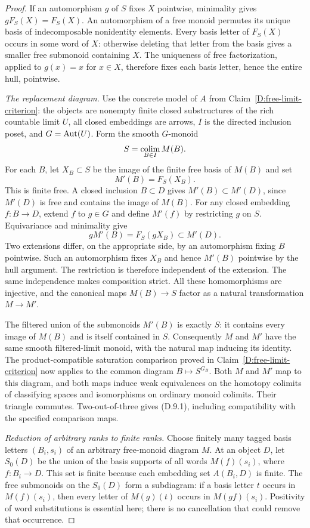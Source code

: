 \begin{proof}
If an automorphism $g$ of $S$ fixes $X$ pointwise, minimality gives
$gF_S(X)=F_S(X)$. An automorphism of a free monoid permutes its
unique basis of indecomposable nonidentity elements. Every basis
letter of $F_S(X)$ occurs in some word of $X$: otherwise deleting
that letter from the basis gives a smaller free submonoid containing
$X$. The uniqueness of free factorization, applied to $g(x)=x$
for $x\in X$, therefore fixes each basis letter, hence the entire
hull, pointwise.

\emph{The replacement diagram.}
Use the concrete model of $A$ from
Claim~\ref{D:free-limit-criterion}: the objects are nonempty finite
closed substructures of the rich countable limit $U$, all closed
embeddings are arrows, $I$ is the directed inclusion poset, and
$G=\operatorname{Aut}(U)$. Form the smooth $G$-monoid
\[
 S=\operatorname*{colim}_{B\in I}M(B).
\]
For each $B$, let $X_B\subset S$ be the image of the finite free
basis of $M(B)$ and set
\[
 M'(B)=F_S(X_B).
\]
This is finite free. A closed inclusion $B\subset D$ gives
$M'(B)\subset M'(D)$, since $M'(D)$ is free and contains the image
of $M(B)$. For any closed embedding $f:B\to D$, extend $f$ to
$g\in G$ and define $M'(f)$ by restricting $g$ on $S$. Equivariance
and minimality give
\[
 gM'(B)=F_S(gX_B)\subset M'(D).
\]
Two extensions differ, on the appropriate side, by an automorphism
fixing $B$ pointwise. Such an automorphism fixes $X_B$ and hence
$M'(B)$ pointwise by the hull argument. The restriction is therefore
independent of the extension. The same independence makes
composition strict. All these homomorphisms are injective, and the
canonical maps $M(B)\to S$ factor as a natural transformation
$M\to M'$.

The filtered union of the submonoids $M'(B)$ is exactly $S$:
it contains every image of $M(B)$ and is itself contained in $S$.
Consequently $M$ and $M'$ have the same smooth filtered-limit
monoid, with the natural map inducing its identity. The
product-compatible saturation comparison proved in
Claim~\ref{D:free-limit-criterion} now applies to the common diagram
$B\mapsto S^{G_B}$. Both $M$ and $M'$ map to this diagram, and
both maps induce weak equivalences on the homotopy colimits of
classifying spaces and isomorphisms on ordinary monoid colimits.
Their triangle commutes. Two-out-of-three gives (D.9.1), including
compatibility with the specified comparison maps.

\emph{Reduction of arbitrary ranks to finite ranks.}
Choose finitely many tagged basis letters $(B_i,s_i)$ of an
arbitrary free-monoid diagram $M$. At an object $D$, let $S_0(D)$
be the union of the basis supports of all words $M(f)(s_i)$,
where $f:B_i\to D$. This set is finite because each embedding set
$A(B_i,D)$ is finite. The free submonoids on the $S_0(D)$ form a
subdiagram: if a basis letter $t$ occurs in $M(f)(s_i)$, then
every letter of $M(g)(t)$ occurs in $M(gf)(s_i)$. Positivity of
word substitutions is essential here; there is no cancellation
that could remove that occurrence.


\end{proof}
